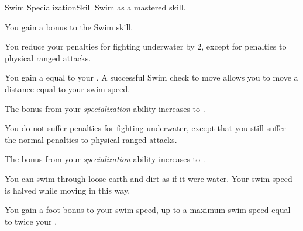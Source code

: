     \begin{feat}{Swim Specialization}{Skill}
        \featpre Swim as a mastered skill.

         You gain a  bonus to the Swim skill.

         You reduce your penalties for fighting underwater by 2, except for penalties to physical ranged attacks.

         You gain a  equal to your .
        A successful Swim check to move allows you to move a distance equal to your swim speed.

         The bonus from your \textit{specialization} ability increases to .

         You do not suffer penalties for fighting underwater, except that you still suffer the normal penalties to physical ranged attacks.

         The bonus from your \textit{specialization} ability increases to .

         You can swim through loose earth and dirt as if it were water.
        Your swim speed is halved while moving in this way.

         You gain a  foot bonus to your swim speed, up to a maximum swim speed equal to twice your .
    \end{feat}

